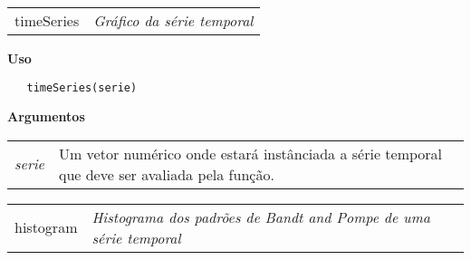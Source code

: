 \documentclass[12pt,letterpaper]{article}
\begin{document}
\newpage

\hrulefill   

\begin{table}[!h]
\begin{center}
\begin{tabularx}{\textwidth}{ X X}
\hspace{0.5cm} timeSeries & \textit{Gráfico da série temporal}\\
\end{tabularx}
\end{center}
\end{table} 

\vspace{-0.5cm}

\hrulefill  

\vspace{0.5cm}

\textbf{Uso}

\begin{lstlisting}
   timeSeries(serie)
\end{lstlisting}

\vspace{0.5cm}

\textbf{Argumentos}

\begin{table}[!h]
\begin{center}
\begin{tabularx}{\textwidth}{X X}
\hspace{0.5cm} \textit{serie} & Um vetor numérico onde estará instânciada a série temporal que deve ser avaliada pela função.\\
\end{tabularx}
\end{center}
\end{table} 

\hrulefill   

\begin{table}[!h]
\begin{center}
\begin{tabularx}{\textwidth}{ X X}
\hspace{0.5cm} histogram & \textit{Histograma dos padrões de Bandt and Pompe de uma série temporal}\\
\end{tabularx}
\end{center}
\end{table} 
\end{document}
